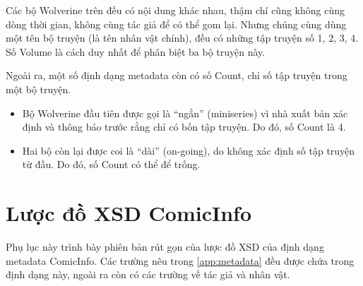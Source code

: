\documentclass[../../../thesis]{subfiles}
\begin{document}
\begin{appendices}
Các bộ Wolverine trên đều có nội dung khác nhau, thậm chí cũng không cùng dòng
thời gian, không cùng tác giả để có thể gom lại. Nhưng chúng cùng dùng một tên
bộ truyện (là tên nhân vật chính), đều có những tập truyện số 1, 2, 3, 4. Số
Volume là cách duy nhất để phân biệt ba bộ truyện này.

Ngoài ra, một số định dạng metadata còn có số Count, chỉ số tập truyện trong một
bộ truyện.

\begin{itemize}
    \item
        Bộ Wolverine đầu tiên được gọi là ``ngắn'' (miniseries) vì nhà xuất bản
        xác định và thông báo trước rằng chỉ có bốn tập truyện. Do đó, số Count
        là 4.
    \item
        Hai bộ còn lại được coi là ``dài'' (on-going), do không xác định số tập
        truyện từ đầu. Do đó, số Count có thể để trống.
\end{itemize}



\chapter{Lược đồ XSD ComicInfo}\label{app:comic-info-xsd}

Phụ lục này trình bày phiên bản rút gọn của lược đồ XSD của định dạng metadata
ComicInfo. Các trường nêu trong \autoref{app:metadata} đều được chứa trong định
dạng này, ngoài ra còn có các trường về tác giả và nhân vật.



\end{appendices}
\end{document}
